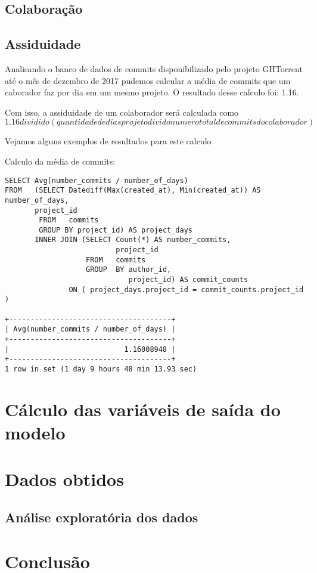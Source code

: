 \subsection{Colaboração}

\subsection{Assiduidade}

Analisando o banco de dados de commits disponibilizado pelo projeto GHTorrent até o mês de dezembro de 2017 pudemos calcular a média de commits que um caborador faz por dia em um mesmo projeto. O resultado desse calculo foi: 1.16.

Com isso, a assiduidade de um colaborador será calculada como $1.16 dividido  (quantidade de dias projeto divido  numero total de commits do colaborador)$

Vejamos alguns exemplos de resultados para este calculo


Calculo da média de commits:

\begin{lstlisting}
SELECT Avg(number_commits / number_of_days) 
FROM   (SELECT Datediff(Max(created_at), Min(created_at)) AS number_of_days, 
       project_id 
        FROM   commits 
        GROUP BY project_id) AS project_days 
       INNER JOIN (SELECT Count(*) AS number_commits, 
                          project_id 
                   FROM   commits 
                   GROUP  BY author_id, 
                             project_id) AS commit_counts 
               ON ( project_days.project_id = commit_counts.project_id )
               
+--------------------------------------+
| Avg(number_commits / number_of_days) |
+--------------------------------------+
|                           1.16008948 |
+--------------------------------------+
1 row in set (1 day 9 hours 48 min 13.93 sec) 

\end{lstlisting}

\section{Cálculo das variáveis de saída do modelo}

\section{Dados obtidos}

\subsection{Análise exploratória dos dados}

\section{Conclusão}





